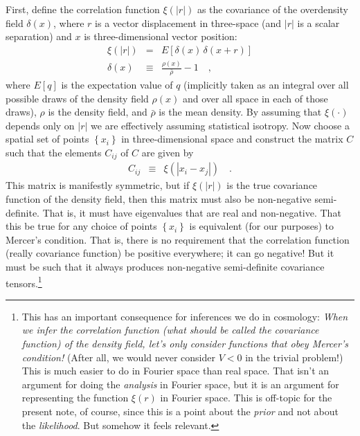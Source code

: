\documentclass[12pt, letterpaper, preprint]{aastex}
\newcommand{\setof}[1]{\left\{{#1}\right\}}
\newcommand{\documentname}{note}
\begin{document}
First, define the correlation function $\xi(|r|)$ as the covariance of
the overdensity field $\delta(x)$, where $r$ is a vector displacement
in three-space (and $|r|$ is a scalar separation) and $x$ is
three-dimensional vector position:
\begin{eqnarray}
\xi(|r|) &=& E[\delta(x)\,\delta(x+r)]
\\
\delta(x) &\equiv& \frac{\rho(x)}{\bar{\rho}} - 1
\quad ,
\end{eqnarray}
where $E[q]$ is the expectation value of $q$ (implicitly taken as an integral
over all possible draws of the density field $\rho(x)$ and over all space in each of those draws),
$\rho$ is the density field,
and $\bar{\rho}$ is the mean density.
By assuming that $\xi(\cdot)$ depends only on $|r|$ we are effectively
assuming statistical isotropy.
Now choose a spatial set of points $\setof{x_i}$ in three-dimensional space
and construct the matrix $C$ such that the elements $C_{ij}$ of $C$
are given by
\begin{eqnarray}
C_{ij} &\equiv& \xi(|x_i - x_j|)
\quad .
\end{eqnarray}
This matrix is manifestly symmetric, but if $\xi(|r|)$ is the true
covariance function of the density field, then this matrix must also
be non-negative semi-definite.
That is, it must have eigenvalues that are real and non-negative.
That this be true for any choice of points $\setof{x_i}$ is equivalent
(for our purposes) to Mercer's condition.
That is, there is no requirement that the correlation function (really
covariance function) be positive everywhere; it can go negative!
But it must be such that it always produces non-negative semi-definite
covariance tensors.\footnote{This has an important consequence for
  inferences we do in cosmology: \emph{When we infer the correlation
    function (what should be called the covariance function) of the
    density field, let's only consider functions that obey Mercer's
    condition!}  (After all, we would never consider $V<0$ in the
  trivial problem!)  This is much easier to do in Fourier space than
  real space.  That isn't an argument for doing the \emph{analysis} in
  Fourier space, but it is an argument for representing the function
  $\xi(r)$ in Fourier space. This is off-topic for the present
  \documentname, of course, since this is a point about the
  \emph{prior} and not about the \emph{likelihood}. But somehow it
  feels relevant.}
\end{document}
